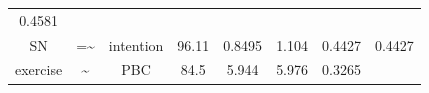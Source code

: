 \documentclass[]{article}
\theoremstyle{definition}
\theoremstyle{definition}
\theoremstyle{definition}
\theoremstyle{remark}
\begin{document}
\begin{longtable}[]{@{}cccccccc@{}}
\begin{minipage}[t]{0.11\columnwidth}
0.4581\strut
\end{minipage}\tabularnewline
\begin{minipage}[t]{0.11\columnwidth}\centering\strut
SN\strut
\end{minipage} & \begin{minipage}[t]{0.05\columnwidth}\centering\strut
=\textasciitilde{}\strut
\end{minipage} & \begin{minipage}[t]{0.12\columnwidth}\centering\strut
intention\strut
\end{minipage} & \begin{minipage}[t]{0.08\columnwidth}\centering\strut
96.11\strut
\end{minipage} & \begin{minipage}[t]{0.10\columnwidth}\centering\strut
0.8495\strut
\end{minipage} & \begin{minipage}[t]{0.10\columnwidth}\centering\strut
1.104\strut
\end{minipage} & \begin{minipage}[t]{0.11\columnwidth}\centering\strut
0.4427\strut
\end{minipage} & \begin{minipage}[t]{0.11\columnwidth}\centering\strut
0.4427\strut
\end{minipage}\tabularnewline
\begin{minipage}[t]{0.11\columnwidth}\centering\strut
exercise\strut
\end{minipage} & \begin{minipage}[t]{0.05\columnwidth}\centering\strut
\textasciitilde{}\strut
\end{minipage} & \begin{minipage}[t]{0.12\columnwidth}\centering\strut
PBC\strut
\end{minipage} & \begin{minipage}[t]{0.08\columnwidth}\centering\strut
84.5\strut
\end{minipage} & \begin{minipage}[t]{0.10\columnwidth}\centering\strut
5.944\strut
\end{minipage} & \begin{minipage}[t]{0.10\columnwidth}\centering\strut
5.976\strut
\end{minipage} & \begin{minipage}[t]{0.11\columnwidth}\centering\strut
0.3265\strut
\end{minipage} & \begin{minipage}[t]{0.11\columnwidth}\centering\strut

\end{minipage}
\end{longtable}
\end{document}
